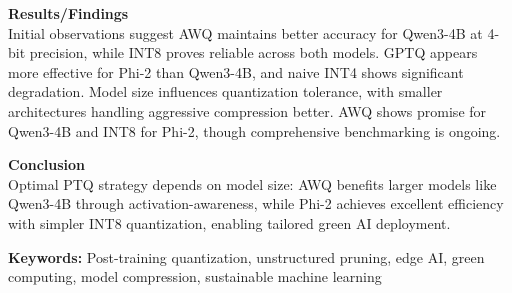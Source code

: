 \documentclass[12pt]{article}
\begin{document}
\vspace{12pt}

\noindent\textbf{Results/Findings}\\
Initial observations suggest AWQ maintains better accuracy for Qwen3-4B at 4-bit precision, while INT8 proves reliable across both models. GPTQ appears more effective for Phi-2 than Qwen3-4B, and naive INT4 shows significant degradation. Model size influences quantization tolerance, with smaller architectures handling aggressive compression better. AWQ shows promise for Qwen3-4B and INT8 for Phi-2, though comprehensive benchmarking is ongoing.

\vspace{12pt}

\noindent\textbf{Conclusion}\\
Optimal PTQ strategy depends on model size: AWQ benefits larger models like Qwen3-4B through activation-awareness, while Phi-2 achieves excellent efficiency with simpler INT8 quantization, enabling tailored green AI deployment.

\vspace{18pt}

\noindent\textbf{Keywords:} Post-training quantization, unstructured pruning, edge AI, green computing, model compression, sustainable machine learning
\end{document}
